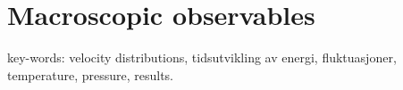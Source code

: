 \section{Macroscopic observables}
key-words: velocity distributions, tidsutvikling av energi, fluktuasjoner, temperature, pressure, results.